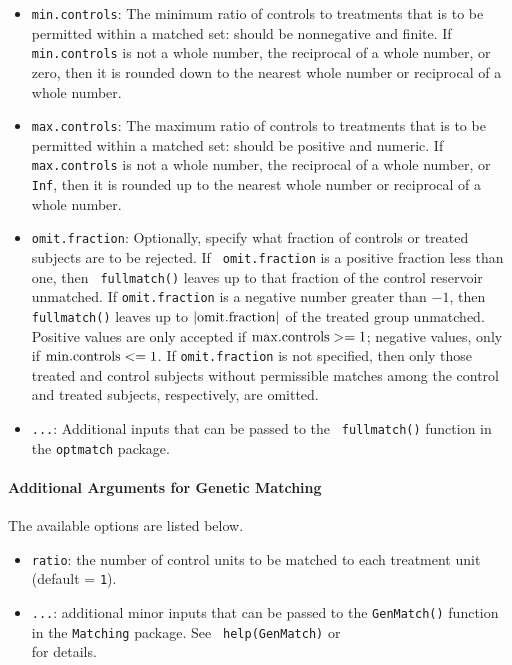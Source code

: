 \begin{itemize}
\item {\tt min.controls}: The minimum ratio of controls to treatments
  that is to be permitted within a matched set: should be nonnegative
  and finite.  If {\tt min.controls} is not a whole number, the
  reciprocal of a whole number, or zero, then it is rounded down to
  the nearest whole number or reciprocal of a whole number.
  
\item {\tt max.controls}: The maximum ratio of controls to treatments
  that is to be permitted within a matched set: should be positive and
  numeric. If {\tt max.controls} is not a whole number, the reciprocal
  of a whole number, or {\tt Inf}, then it is rounded up to the
  nearest whole number or reciprocal of a whole number.
  
\item {\tt omit.fraction}: Optionally, specify what fraction of
  controls or treated subjects are to be rejected.  If {\tt
    omit.fraction} is a positive fraction less than one, then {\tt
    fullmatch()} leaves up to that fraction of the control reservoir
  unmatched.  If {\tt omit.fraction} is a negative number greater than
  $-1$, then {\tt fullmatch()} leaves up to $|{\rm omit.fraction}|$ of
  the treated group unmatched.  Positive values are only accepted if
  ${\rm max.controls} >= 1$; negative values, only if ${\rm
    min.controls} <= 1$.  If {\tt omit.fraction} is not specified,
  then only those treated and control subjects without permissible
  matches among the control and treated subjects, respectively, are
  omitted.

\item {\tt ...}: Additional inputs that can be passed to the {\tt
    fullmatch()} function in the {\tt optmatch} package.
\end{itemize}

\paragraph{Additional Arguments for Genetic Matching}
\label{subsubsec:inputs-genetic}

The available options are listed below.
\begin{itemize}
\item {\tt ratio}: the number of control units to be matched to each
  treatment unit (default = {\tt 1}).
\item {\tt ...}: additional minor inputs that can be passed to the
  {\tt GenMatch()} function in the {\tt Matching} package. See {\tt
    help(GenMatch)} or\\
  for details.
\end{itemize}


